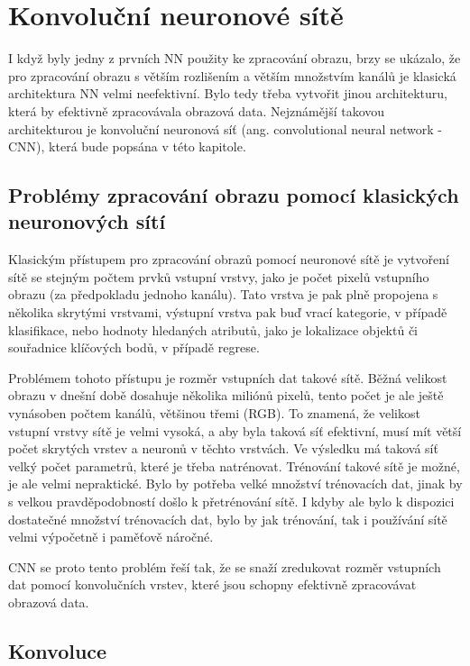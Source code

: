 \chapter{Konvoluční neuronové sítě}
\label{chap:CNN}

I když byly jedny z prvních NN použity ke zpracování obrazu, brzy se ukázalo,
že pro zpracování obrazu s větším rozlišením a větším množstvím kanálů je
klasická architektura NN velmi neefektivní. Bylo tedy třeba vytvořit jinou
architekturu, která by efektivně zpracovávala obrazová data. Nejznámější
takovou architekturou je konvoluční neuronová síť (ang. convolutional neural
network - CNN), která bude popsána v této kapitole.

\section{Problémy zpracování obrazu pomocí klasických neuronových sítí}

Klasickým přístupem pro zpracování obrazů pomocí neuronové sítě je vytvoření
sítě se stejným počtem prvků vstupní vrstvy, jako je počet pixelů vstupního
obrazu (za předpokladu jednoho kanálu). Tato vrstva je pak plně propojena s
několika skrytými vrstvami, výstupní vrstva pak buď vrací kategorie, v případě
klasifikace, nebo hodnoty hledaných atributů, jako je lokalizace objektů či
souřadnice klíčových bodů, v případě regrese.

Problémem tohoto přístupu je rozměr vstupních dat takové sítě. Běžná velikost
obrazu v dnešní době dosahuje několika miliónů pixelů, tento počet je ale ještě
vynásoben počtem kanálů, většinou třemi (RGB). To znamená, že velikost vstupní
vrstvy sítě je velmi vysoká, a aby byla taková síť efektivní, musí mít větší
počet skrytých vrstev a neuronů v těchto vrstvách. Ve výsledku má taková síť
velký počet parametrů, které je třeba natrénovat. Trénování takové sítě je
možné, je ale velmi nepraktické. Bylo by potřeba velké množství trénovacích
dat, jinak by s velkou pravděpodobností došlo k přetrénování sítě. I kdyby ale
bylo k dispozici dostatečné množství trénovacích dat, bylo by jak trénování,
tak i používání sítě velmi výpočetně i paměťově náročné.

CNN se proto tento problém řeší tak, že se snaží zredukovat rozměr vstupních
dat pomocí konvolučních vrstev, které jsou schopny efektivně zpracovávat
obrazová data.

\section{Konvoluce}

